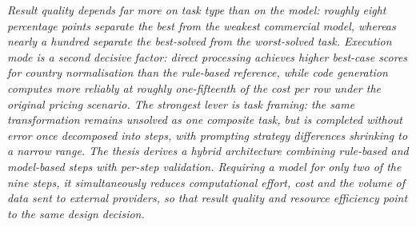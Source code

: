 \vspace{0.4em}
\noindent
\textit{Result quality depends far more on task type than on the model: roughly eight percentage points separate the best from the weakest commercial model, whereas nearly a hundred separate the best-solved from the worst-solved task. Execution mode is a second decisive factor: direct processing achieves higher best-case scores for country normalisation than the rule-based reference, while code generation computes more reliably at roughly one-fifteenth of the cost per row under the original pricing scenario. The strongest lever is task framing: the same transformation remains unsolved as one composite task, but is completed without error once decomposed into steps, with prompting strategy differences shrinking to a narrow range. The thesis derives a hybrid architecture combining rule-based and model-based steps with per-step validation. Requiring a model for only two of the nine steps, it simultaneously reduces computational effort, cost and the volume of data sent to external providers, so that result quality and resource efficiency point to the same design decision.}

